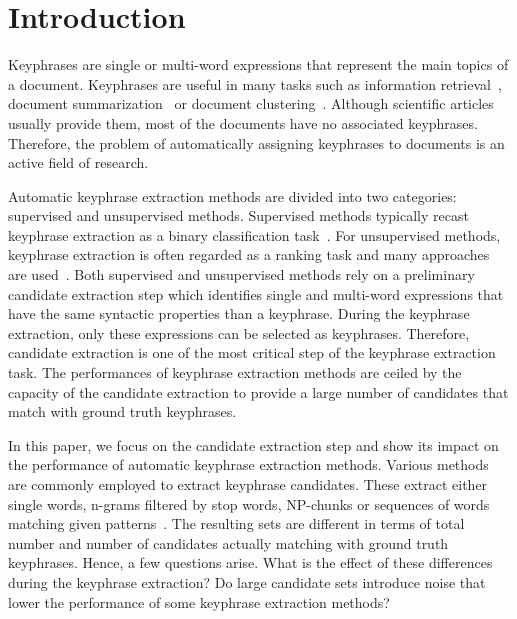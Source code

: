 \section{Introduction}
\label{sec:section}
  Keyphrases are single or multi-word expressions that represent the main topics
  of a document. Keyphrases are useful in many tasks such as information
  retrieval~\cite{medelyan2008smalltrainingset}, document
  summarization~\cite{litvak2008graphbased} or document
  clustering~\cite{han2007webdocumentclustering}. Although scientific articles
  usually provide them, most of the documents have no associated keyphrases.
  Therefore, the problem of automatically assigning keyphrases to documents is
  an active field of research.

  Automatic keyphrase extraction methods are divided into two categories:
  supervised and unsupervised methods. Supervised methods typically recast
  keyphrase extraction as a binary classification
  task~\cite{witten1999kea,sujian2003maximumentropy,eichler2010keywe}. For
  unsupervised methods, keyphrase extraction is often regarded as a ranking
  task and many approaches are
  used~\cite{barker2000nounphrasehead,tomokiyo2003languagemodel,mihalcea2004textrank}.
  Both supervised and unsupervised methods rely on a preliminary candidate
  extraction step which identifies single and multi-word expressions that have
  the same syntactic properties than a keyphrase. During the keyphrase
  extraction, only these expressions can be selected as keyphrases. Therefore,
  candidate extraction is one of the most critical step of the keyphrase
  extraction task. The performances of keyphrase extraction methods are ceiled
  by the capacity of the candidate extraction to provide a large number of
  candidates that match with ground truth keyphrases.
  
  In this paper, we focus on the candidate extraction step and show its impact
  on the performance of automatic keyphrase extraction methods. Various methods
  are commonly employed to extract keyphrase candidates. These extract either
  single words, n-grams filtered by stop words, NP-chunks or sequences of words
  matching given patterns~\cite{hulth2003keywordextraction}. The resulting sets
  are different in terms of total number and number of candidates actually
  matching with ground truth keyphrases. Hence, a few questions arise. What is
  the effect of these differences during the keyphrase extraction? Do large
  candidate sets introduce noise that lower the performance of some keyphrase
  extraction methods?

